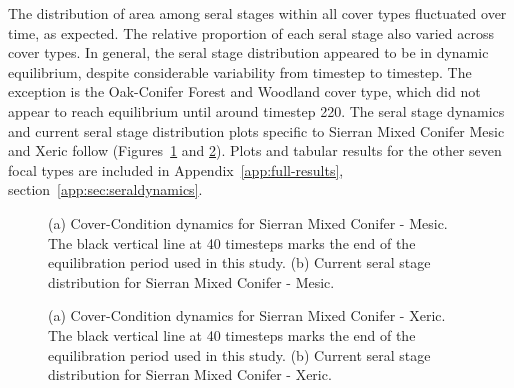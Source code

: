 The distribution of area among seral stages within all cover types fluctuated over time, as expected. The relative proportion of each seral stage also varied across cover types. In general, the seral stage distribution appeared to be in dynamic equilibrium, despite considerable variability from timestep to timestep. The exception is the Oak-Conifer Forest and Woodland cover type, which did not appear to reach equilibrium until around timestep 220. The seral stage dynamics and current seral stage distribution plots specific to Sierran Mixed Conifer Mesic and Xeric follow (Figures~\ref{fig:covcond_smcm} and \ref{fig:covcond_smcx}). Plots and tabular results for the other seven focal types are included in Appendix~\ref{app:full-results}, section~\ref{app:sec:seraldynamics}.



\begin{figure}[!htbp]
  \centering
  \caption{(a) Cover-Condition dynamics for Sierran Mixed Conifer - Mesic. The black vertical line at 40 timesteps marks the end of the equilibration period used in this study. (b) Current seral stage distribution for Sierran Mixed Conifer - Mesic.} 
  \label{fig:covcond_smcm}
\end{figure}


\begin{figure}[!htbp]
  \centering
  \caption{(a) Cover-Condition dynamics for Sierran Mixed Conifer - Xeric. The black vertical line at 40 timesteps marks the end of the equilibration period used in this study. (b) Current seral stage distribution for Sierran Mixed Conifer - Xeric.} 
  \label{fig:covcond_smcx}
\end{figure}



\clearpage

